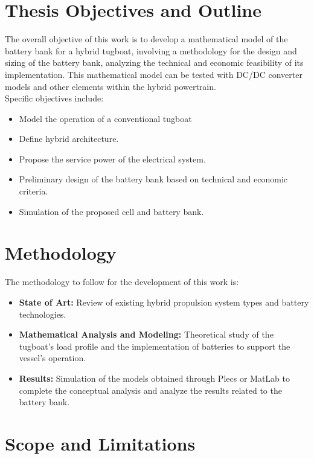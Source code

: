  

\section{Thesis Objectives and Outline}

The overall objective of this work is to develop a mathematical model of the battery bank for a hybrid tugboat, involving a methodology for the design and sizing of the battery bank, analyzing the technical and economic feasibility of its implementation. This mathematical model can be tested with DC/DC converter models and other elements within the hybrid powertrain.\\

Specific objectives include:

\begin{itemize}
\item Model the operation of a conventional tugboat
\item Define hybrid architecture.
\item Propose the service power of the electrical system.
\item Preliminary design of the battery bank based on technical and economic criteria.
\item Simulation of the proposed cell and battery bank.
\end{itemize}

\section{Methodology}

The methodology to follow for the development of this work is:

\begin{itemize}
	\item \textbf{State of Art:} Review of existing hybrid propulsion system types and battery technologies. 
	\item \textbf{Mathematical Analysis and Modeling:} Theoretical study of the tugboat's load profile and the implementation of batteries to support the vessel's operation.
	\item \textbf{Results:} Simulation of the models obtained through Plecs or MatLab to complete the conceptual analysis and analyze the results related to the battery bank.
\end{itemize}

\section{Scope and Limitations}

